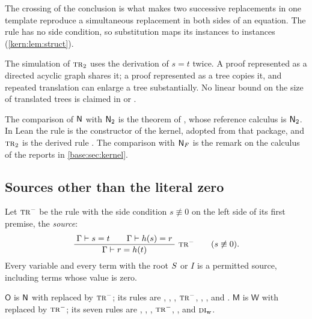 The crossing of the conclusion is what makes two successive replacements in
one template reproduce a simultaneous replacement in both sides of an
equation.  The rule  has no side condition, so substitution maps
its instances to instances (\cref{kern:lem:struct}).

\begin{remark}
\label{kern:rem:dag}
The simulation of $\rulename{Tr}_{2}$ uses the derivation of $s=t$ twice.  A
proof represented as a directed acyclic graph shares it; a proof represented
as a tree copies it, and repeated translation can enlarge a tree
substantially.  No linear bound on the size of translated trees is claimed
in  or .
\end{remark}

\begin{remark}[Sources]
\label{kern:rem:onecontext-sources}
The comparison of $\mathsf{N}$ with $\mathsf{N}_{2}$ is the theorem of
, whose reference calculus is $\mathsf{N}_{2}$.  In Lean the rule
 is the constructor  of the kernel, adopted
from that package, and $\rulename{Tr}_{2}$ is the derived rule
.  The comparison with $\mathsf{N}_{F}$ is the remark on the
calculus of the reports in \cref{base:sec:kernel}.
\end{remark}

\subsection{Sources other than the literal zero}
\label{kern:sec:onesided}

Let $\rulename{Tr}^{-}$ be the rule  with the side condition
$s\not\equiv 0$ on the left side of its first premise, the \emph{source}:
\[
 \infrule{\Gamma\proves s=t\qquad\Gamma\proves h(s)=r}
         {\Gamma\proves r=h(t)}\ \rulename{Tr}^{-}
 \qquad(s\not\equiv 0).
\]
Every variable and every term with the root $S$ or $I$ is a permitted
source, including terms whose value is zero.

\begin{definition}
\label{kern:def:OM}
$\mathsf{O}$ is $\mathsf{N}$ with  replaced by $\rulename{Tr}^{-}$;
its rules are , , ,
$\rulename{Tr}^{-}$, , ,  and
.  $\mathsf{M}$ is $\mathsf{W}$ with  replaced by
$\rulename{Tr}^{-}$; its seven rules are , ,
, $\rulename{Tr}^{-}$, ,  and
$\rulename{DI}_{\mathrm{w}}$.
\end{definition}

